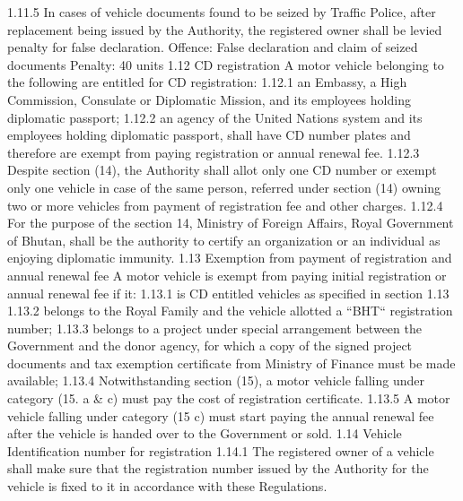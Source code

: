 \documentclass[
]{book}
\begin{document}
1.11.5 In cases of vehicle documents found to be seized by Traffic Police, after replacement being issued by the Authority, the registered owner shall be levied penalty for false declaration.
Offence: False declaration and claim of seized documents
Penalty: 40 units
1.12 CD registration
A motor vehicle belonging to the following are entitled for CD registration:
1.12.1 an Embassy, a High Commission, Consulate or Diplomatic Mission, and its employees holding diplomatic passport;
1.12.2 an agency of the United Nations system and its employees holding diplomatic passport, shall have CD number plates and therefore are exempt from paying registration or annual renewal fee.
1.12.3 Despite section (14), the Authority shall allot only one CD number or exempt only one vehicle in case of the same person, referred under section (14) owning two or more vehicles from payment of registration fee and other charges.
1.12.4 For the purpose of the section 14, Ministry of Foreign Affairs, Royal Government of Bhutan, shall be the authority to certify an organization or an individual as enjoying diplomatic immunity.
1.13 Exemption from payment of registration and annual renewal fee
A motor vehicle is exempt from paying initial registration or annual renewal fee if it:
1.13.1 is CD entitled vehicles as specified in section 1.13
1.13.2 belongs to the Royal Family and the vehicle allotted a ``BHT`` registration number;
1.13.3 belongs to a project under special arrangement between the Government and the donor agency, for which a copy of the signed project documents and tax exemption certificate from Ministry of Finance must be made available;
1.13.4 Notwithstanding section (15), a motor vehicle falling under category (15. a \& c) must pay the cost of registration certificate.
1.13.5 A motor vehicle falling under category (15 c) must start paying the annual renewal fee after the vehicle is handed over to the Government or sold.
1.14 Vehicle Identification number for registration
1.14.1 The registered owner of a vehicle shall make sure that the registration number issued by the Authority for the vehicle is fixed to it in accordance with these Regulations.
\end{document}
